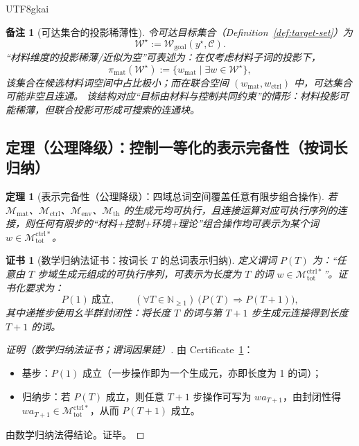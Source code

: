\documentclass[12pt]{article}
\newtheorem{theorem}{定理}[section]
\newtheorem{remark}{备注}[section]
\newtheorem{certificate}{证书}[section]
\begin{document}
\begin{CJK*}{UTF8}{gkai}
\begin{remark}[可达集合的投影稀薄性]
\label{rem:reachable-projection-sparse}
令可达目标集合（Definition~\ref{def:target-set}）为
\[
\mathcal{W}^\star:=\mathcal{W}_{\mathrm{goal}}(y^\star,\mathcal{C}).
\]
“材料维度的投影稀薄/近似为空”可表述为：在仅考虑材料子词的投影下，
\[
\pi_{\mathrm{mat}}(\mathcal{W}^\star):=\{w_{\mathrm{mat}}\mid \exists w\in\mathcal{W}^\star\},
\]
该集合在候选材料词空间中占比极小；而在联合空间 $(w_{\mathrm{mat}},w_{\mathrm{ctrl}})$ 中，可达集合可能非空且连通。
该结构对应“目标由材料与控制共同约束”的情形：材料投影可能稀薄，但联合投影可形成可搜索的连通块。
\end{remark}

\subsection{定理（公理降级）：控制一等化的表示完备性（按词长归纳）}

\begin{theorem}[表示完备性（公理降级）：四域总词空间覆盖任意有限步组合操作]
\label{thm:ctrl-first-class-completeness}
若 $\mathcal{M}_{\mathrm{mat}}$、$\mathcal{M}_{\mathrm{ctrl}}$、$\mathcal{M}_{\mathrm{env}}$、$\mathcal{M}_{\mathrm{th}}$
  的生成元均可执行，且连接运算对应可执行序列的连接，则任何有限步的“材料+控制+环境+理论”组合操作均可表示为某个词 $w\in\mathcal{M}_{\mathrm{tot}}^{\mathrm{ctrl}\ast}$。
\end{theorem}

\begin{certificate}[数学归纳法证书：按词长 $T$ 的总词表示归纳]
\label{cert:ctrl-first-class-completeness-induction}
定义谓词 $P(T)$ 为：“任意由 $T$ 步域生成元组成的可执行序列，可表示为长度为 $T$ 的词 $w\in\mathcal{M}_{\mathrm{tot}}^{\mathrm{ctrl}\ast}$”。证书化要求为：
\[
P(1)\ \text{成立},\qquad
(\forall T\in\mathbb{N}_{\ge 1})\ \bigl(P(T)\Rightarrow P(T+1)\bigr),
\]
其中递推步使用幺半群封闭性：将长度 $T$ 的词与第 $T{+}1$ 步生成元连接得到长度 $T{+}1$ 的词。
\end{certificate}

\begin{proof}[证明（数学归纳法证书；谓词因果链）]
由 Certificate~\ref{cert:ctrl-first-class-completeness-induction}：
\begin{itemize}
  \item 基步：$P(1)$ 成立（一步操作即为一个生成元，亦即长度为 1 的词）；
  \item 归纳步：若 $P(T)$ 成立，则任意 $T{+}1$ 步操作可写为 $w a_{T+1}$，由封闭性得 $w a_{T+1}\in\mathcal{M}_{\mathrm{tot}}^{\mathrm{ctrl}\ast}
    $，从而 $P(T{+}1)$ 成立。
\end{itemize}
由数学归纳法得结论。证毕。
\end{proof}


\end{CJK*}
\end{document}
